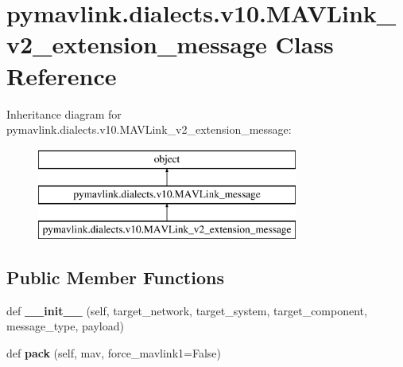 \hypertarget{classpymavlink_1_1dialects_1_1v10_1_1MAVLink__v2__extension__message}{}\section{pymavlink.\+dialects.\+v10.\+M\+A\+V\+Link\+\_\+v2\+\_\+extension\+\_\+message Class Reference}
\label{classpymavlink_1_1dialects_1_1v10_1_1MAVLink__v2__extension__message}
Inheritance diagram for pymavlink.\+dialects.\+v10.\+M\+A\+V\+Link\+\_\+v2\+\_\+extension\+\_\+message\+:\begin{figure}[H]
\begin{center}
\leavevmode
\includegraphics[height=3.000000cm]{classpymavlink_1_1dialects_1_1v10_1_1MAVLink__v2__extension__message}
\end{center}
\end{figure}
\subsection*{Public Member Functions}
\begin{DoxyCompactItemize}
\item 
\mbox{\label{classpymavlink_1_1dialects_1_1v10_1_1MAVLink__v2__extension__message_a4a3c85b76ccd74b7ade238a867d7d3e0}} 
def {\bfseries \+\_\+\+\_\+init\+\_\+\+\_\+} (self, target\+\_\+network, target\+\_\+system, target\+\_\+component, message\+\_\+type, payload)
\item 
\mbox{\label{classpymavlink_1_1dialects_1_1v10_1_1MAVLink__v2__extension__message_a372b3285ffc90c10a811b11560e0c451}} 
def {\bfseries pack} (self, mav, force\+\_\+mavlink1=False)
\end{DoxyCompactItemize}

